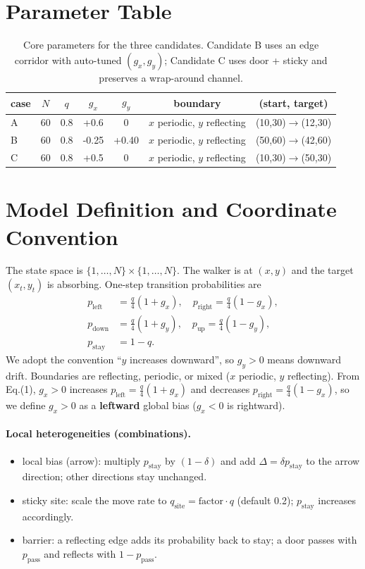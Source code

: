 \documentclass[11pt]{article}
\begin{document}
\section*{Parameter Table}
\begin{table}[!htbp]
  \centering
  \begin{tabular}{lcccccc}
    \toprule
    case & $N$ & $q$ & $g_x$ & $g_y$ & boundary & (start, target) \\
    \midrule
    A & 60 & 0.8 & +0.6 & 0 & $x$ periodic, $y$ reflecting & (10,30)$\to$(12,30) \\
    B & 60 & 0.8 & -0.25 & +0.40 & $x$ periodic, $y$ reflecting & (50,60)$\to$(42,60) \\
    C & 60 & 0.8 & +0.5 & 0 & $x$ periodic, $y$ reflecting & (10,30)$\to$(50,30) \\
    \bottomrule
  \end{tabular}
  \caption{Core parameters for the three candidates. Candidate B uses an edge corridor with auto-tuned $(g_x,g_y)$; Candidate C uses door + sticky and preserves a wrap-around channel.}
  \label{tab:params}
\end{table}

\section{Model Definition and Coordinate Convention}
The state space is $\{1,\dots,N\}\times\{1,\dots,N\}$. The walker is at $(x,y)$ and the target $(x_t,y_t)$ is absorbing. One-step transition probabilities are
\begin{align}
  p_{\text{left}} &= \frac{q}{4}(1+g_x),\quad p_{\text{right}} = \frac{q}{4}(1-g_x),\\
  p_{\text{down}} &= \frac{q}{4}(1+g_y),\quad p_{\text{up}} = \frac{q}{4}(1-g_y),\\
  p_{\text{stay}} &= 1-q.
\end{align}
We adopt the convention ``$y$ increases downward'', so $g_y>0$ means downward drift. Boundaries are reflecting, periodic, or mixed ($x$ periodic, $y$ reflecting).
\noindent From Eq.(1), \(g_x>0\) increases \(p_{\text{left}}=\frac{q}{4}(1+g_x)\) and decreases \(p_{\text{right}}=\frac{q}{4}(1-g_x)\), so we define \(g_x>0\) as a \textbf{leftward} global bias (\(g_x<0\) is rightward).

\paragraph{Local heterogeneities (combinations).}
\begin{itemize}
  \item local bias (arrow): multiply $p_{\text{stay}}$ by $(1-\delta)$ and add $\Delta=\delta p_{\text{stay}}$ to the arrow direction; other directions stay unchanged.
  \item sticky site: scale the move rate to $q_{\text{site}}=\text{factor}\cdot q$ (default 0.2); $p_{\text{stay}}$ increases accordingly.
  \item barrier: a reflecting edge adds its probability back to stay; a door passes with $p_{\text{pass}}$ and reflects with $1-p_{\text{pass}}$.
\end{itemize}
\end{document}
